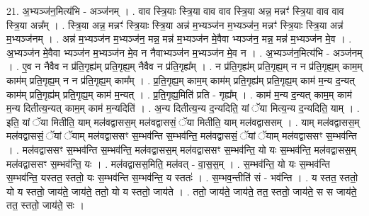 \documentclass[17pt]{extarticle}
\begin{document}
21. अ॒भ्यञ्ज॑न॒मित्य॑भि - अञ्ज॑नम् । . वाव स्त्रि॒याः स्त्रि॒या वाव वाव स्त्रि॒या अन्न॒ मन्नꣳ॑ स्त्रि॒या वाव वाव स्त्रि॒या अन्न᳚म् । . स्त्रि॒या अन्न॒ मन्नꣳ॑ स्त्रि॒याः स्त्रि॒या अन्न॑ म॒भ्यञ्ज॑न म॒भ्यञ्ज॑न॒ मन्नꣳ॑ स्त्रि॒याः स्त्रि॒या अन्न॑ म॒भ्यञ्ज॑नम् । . अन्न॑ म॒भ्यञ्ज॑न म॒भ्यञ्ज॑न॒ मन्न॒ मन्न॑ म॒भ्यञ्ज॑न मे॒वैवा भ्यञ्ज॑न॒ मन्न॒ मन्न॑ म॒भ्यञ्ज॑न मे॒व । . अ॒भ्यञ्ज॑न मे॒वैवा भ्यञ्ज॑न म॒भ्यञ्ज॑न मे॒व न नैवाभ्यञ्ज॑न म॒भ्यञ्ज॑न मे॒व न । . अ॒भ्यञ्ज॑न॒मित्य॑भि - अञ्ज॑नम् । . ए॒व न नैवैव न प्र॑ति॒गृह्य॑म् प्रति॒गृह्य॒म् नैवैव न प्र॑ति॒गृह्य᳚म् । . न प्र॑ति॒गृह्य॑म् प्रति॒गृह्य॒म् न न प्र॑ति॒गृह्य॒म् काम॒म् काम॑म् प्रति॒गृह्य॒म् न न प्र॑ति॒गृह्य॒म् काम᳚म् । . प्र॒ति॒गृह्य॒म् काम॒म् काम॑म् प्रति॒गृह्य॑म् प्रति॒गृह्य॒म् काम॑ म॒न्य द॒न्यत् काम॑म् प्रति॒गृह्य॑म् प्रति॒गृह्य॒म् काम॑ म॒न्यत् । . प्र॒ति॒गृह्य॒मिति॑ प्रति - गृह्य᳚म् । . काम॑ म॒न्य द॒न्यत् काम॒म् काम॑ म॒न्य दितीत्य॒न्यत् काम॒म् काम॑ म॒न्यदिति॑ । . अ॒न्य दितीत्य॒न्य द॒न्यदिति॒ यां ॅया मित्य॒न्य द॒न्यदिति॒ याम् । . इति॒ यां ॅया मितीति॒ याम् मल॑वद्वासस॒म् मल॑वद्वाससं॒ ॅया मितीति॒ याम् मल॑वद्वाससम् । . याम् मल॑वद्वासस॒म् मल॑वद्वाससं॒ ॅयां ॅयाम् मल॑वद्वाससꣳ स॒म्भव॑न्ति स॒म्भव॑न्ति॒ मल॑वद्वाससं॒ ॅयां ॅयाम् मल॑वद्वाससꣳ स॒म्भव॑न्ति । . मल॑वद्वाससꣳ स॒म्भव॑न्ति स॒म्भव॑न्ति॒ मल॑वद्वासस॒म् मल॑वद्वाससꣳ स॒म्भव॑न्ति॒ यो यः स॒म्भव॑न्ति॒ मल॑वद्वासस॒म् मल॑वद्वाससꣳ स॒म्भव॑न्ति॒ यः । . मल॑वद्वासस॒मिति॒ मल॑वत् - वा॒स॒स॒म् । . स॒म्भव॑न्ति॒ यो यः स॒म्भव॑न्ति स॒म्भव॑न्ति॒ यस्तत॒ स्ततो॒ यः स॒म्भव॑न्ति स॒म्भव॑न्ति॒ य स्ततः॑ । . स॒म्भव॒न्तीति॑ सं - भव॑न्ति । . य स्तत॒ स्ततो॒ यो य स्ततो॒ जाय॑ते॒ जाय॑ते॒ ततो॒ यो य स्ततो॒ जाय॑ते । . ततो॒ जाय॑ते॒ जाय॑ते॒ तत॒ स्ततो॒ जाय॑ते॒ स स जाय॑ते॒ तत॒ स्ततो॒ जाय॑ते॒ सः । \newline
\end{document}
